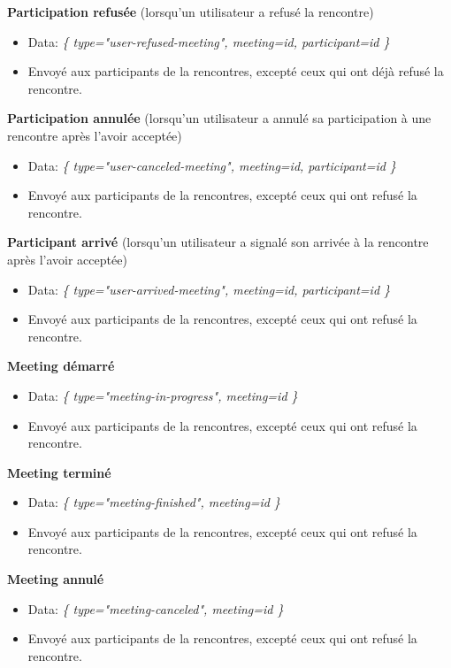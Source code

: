\documentclass[french]{article}
\begin{document}
	\textbf{Participation refusée} (lorsqu'un utilisateur a refusé la rencontre)
	\begin{itemize}
		\item Data: \emph{\{ type="user-refused-meeting", meeting=id, participant=id \}}
		\item Envoyé aux participants de la rencontres, excepté ceux qui ont déjà refusé la rencontre.
	\end{itemize}
		
	\textbf{Participation annulée} (lorsqu'un utilisateur a annulé sa participation à une rencontre après l'avoir acceptée)
	\begin{itemize}
		\item Data: \emph{\{ type="user-canceled-meeting", meeting=id, participant=id \}}
		\item Envoyé aux participants de la rencontres, excepté ceux qui ont refusé la rencontre.
	\end{itemize}
			
	\textbf{Participant arrivé} (lorsqu'un utilisateur a signalé son arrivée à la rencontre après l'avoir acceptée)
	\begin{itemize}
		\item Data: \emph{\{ type="user-arrived-meeting", meeting=id, participant=id \}}
		\item Envoyé aux participants de la rencontres, excepté ceux qui ont refusé la rencontre.
	\end{itemize}
			
	\textbf{Meeting démarré}
	\begin{itemize}
		\item Data: \emph{\{ type="meeting-in-progress", meeting=id \}}
		\item Envoyé aux participants de la rencontres, excepté ceux qui ont refusé la rencontre.
	\end{itemize}
		
	\textbf{Meeting terminé}
	\begin{itemize}
		\item Data: \emph{\{ type="meeting-finished", meeting=id \}}
		\item Envoyé aux participants de la rencontres, excepté ceux qui ont refusé la rencontre.
	\end{itemize}
			
	\textbf{Meeting annulé}
	\begin{itemize}
		\item Data: \emph{\{ type="meeting-canceled", meeting=id \}}
		\item Envoyé aux participants de la rencontres, excepté ceux qui ont refusé la rencontre.
	\end{itemize}
\end{document}
